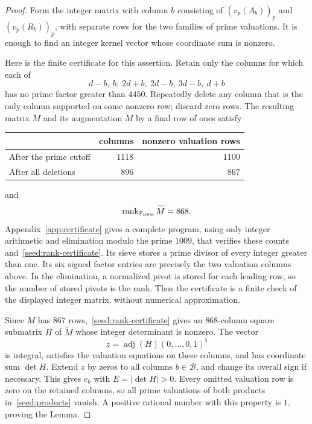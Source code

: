 \begin{proof}
Form the integer matrix with column $b$ consisting of
$(v_p(A_b))_p$ and $(v_p(R_b))_p$, with separate rows for the two
families of prime valuations.  It is enough to find an integer kernel
vector whose coordinate sum is nonzero.

Here is the finite certificate for this assertion.  Retain only the
columns for which each of
\[
 d-b,\ b,\ 2d+b,\ 2d-b,\ 3d-b,\ d+b
\]
has no prime factor greater than $4450$.  Repeatedly delete any column
that is the only column supported on some nonzero row; discard zero
rows.  The resulting matrix $M$ and its augmentation $\widetilde M$
by a final row of ones satisfy
\begin{center}
\begin{tabular}{lrr}
 & columns & nonzero valuation rows\\\hline
After the prime cutoff & $1118$ & $1100$\\
After all deletions & $896$ & $867$
\end{tabular}
\end{center}
and
\begin{equation}\label{seed:rank-certificate}
 \operatorname{rank}_{\mathbb F_{1009}}\widetilde M=868.
\end{equation}
Appendix~\ref{app:certificate} gives a complete program, using only
integer arithmetic and elimination modulo the prime $1009$, that
verifies these counts and~\eqref{seed:rank-certificate}.  Its sieve
stores a prime divisor of every integer greater than one.  Its six
signed factor entries are precisely the two valuation columns above.
In the elimination, a normalized pivot is stored for each leading row,
so the number of stored pivots is the rank.  Thus the certificate is a
finite check of the displayed integer matrix, without numerical
approximation.

Since $M$ has $867$ rows,~\eqref{seed:rank-certificate} gives an
$868$-column square submatrix $H$ of $\widetilde M$ whose integer
determinant is nonzero.  The vector
\[
 z=\operatorname{adj}(H)(0,\ldots,0,1)^{\mathsf t}
\]
is integral, satisfies the valuation equations on these columns, and
has coordinate sum $\det H$.  Extend $z$ by zeros to all columns
$b\in\mathcal B$, and change its overall sign if necessary.  This
gives $e_b$ with $E=|\det H|>0$.  Every omitted valuation row is zero on
the retained columns, so all prime valuations of both products
in~\eqref{seed:products} vanish.  A positive rational number with this
property is $1$, proving the Lemma.
\end{proof}

